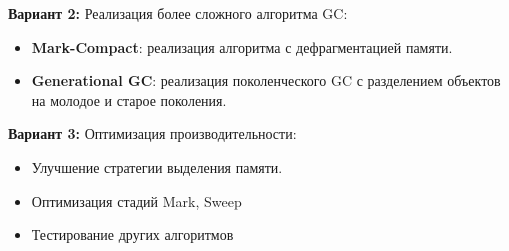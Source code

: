\textbf{Вариант 2:} Реализация более сложного алгоритма GC:
\begin{itemize}
    \item \textbf{Mark-Compact}: реализация алгоритма с дефрагментацией памяти.
    \item \textbf{Generational GC}: реализация поколенческого GC с разделением объектов на молодое и старое поколения.
\end{itemize}

\textbf{Вариант 3:} Оптимизация производительности:
\begin{itemize}
    \item Улучшение стратегии выделения памяти.
    \item Оптимизация стадий Mark, Sweep
    \item Тестирование других алгоритмов
\end{itemize}
